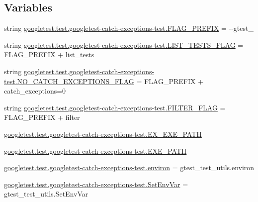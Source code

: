 \subsection*{Variables}
\begin{DoxyCompactItemize}
\item 
string \mbox{\hyperlink{namespacegoogletest_1_1test_1_1googletest-catch-exceptions-test_a0eac6ce19a7544730f48e9ed635da182}{googletest.\+test.\+googletest-\/catch-\/exceptions-\/test.\+F\+L\+A\+G\+\_\+\+P\+R\+E\+F\+IX}} = \textquotesingle{}-\/-\/gtest\+\_\+\textquotesingle{}
\item 
string \mbox{\hyperlink{namespacegoogletest_1_1test_1_1googletest-catch-exceptions-test_a8847d0162a6c3e6a01a74331f3084da8}{googletest.\+test.\+googletest-\/catch-\/exceptions-\/test.\+L\+I\+S\+T\+\_\+\+T\+E\+S\+T\+S\+\_\+\+F\+L\+AG}} = F\+L\+A\+G\+\_\+\+P\+R\+E\+F\+IX + \textquotesingle{}list\+\_\+tests\textquotesingle{}
\item 
string \mbox{\hyperlink{namespacegoogletest_1_1test_1_1googletest-catch-exceptions-test_aaad2a7abcb760b818aa6802120acd651}{googletest.\+test.\+googletest-\/catch-\/exceptions-\/test.\+N\+O\+\_\+\+C\+A\+T\+C\+H\+\_\+\+E\+X\+C\+E\+P\+T\+I\+O\+N\+S\+\_\+\+F\+L\+AG}} = F\+L\+A\+G\+\_\+\+P\+R\+E\+F\+IX + \textquotesingle{}catch\+\_\+exceptions=0\textquotesingle{}
\item 
string \mbox{\hyperlink{namespacegoogletest_1_1test_1_1googletest-catch-exceptions-test_a1233a65dcef8ecb6f518d43e241aeb8d}{googletest.\+test.\+googletest-\/catch-\/exceptions-\/test.\+F\+I\+L\+T\+E\+R\+\_\+\+F\+L\+AG}} = F\+L\+A\+G\+\_\+\+P\+R\+E\+F\+IX + \textquotesingle{}filter\textquotesingle{}
\item 
\mbox{\hyperlink{namespacegoogletest_1_1test_1_1googletest-catch-exceptions-test_a99d8f5239cc54cda82f69509d3b22160}{googletest.\+test.\+googletest-\/catch-\/exceptions-\/test.\+E\+X\+\_\+\+E\+X\+E\+\_\+\+P\+A\+TH}}
\item 
\mbox{\hyperlink{namespacegoogletest_1_1test_1_1googletest-catch-exceptions-test_a410cb8694539d864ade93a277bb03fa5}{googletest.\+test.\+googletest-\/catch-\/exceptions-\/test.\+E\+X\+E\+\_\+\+P\+A\+TH}}
\item 
\mbox{\hyperlink{namespacegoogletest_1_1test_1_1googletest-catch-exceptions-test_a31db01bdbed9bc5476d4747cacb3b668}{googletest.\+test.\+googletest-\/catch-\/exceptions-\/test.\+environ}} = gtest\+\_\+test\+\_\+utils.\+environ
\item 
\mbox{\hyperlink{namespacegoogletest_1_1test_1_1googletest-catch-exceptions-test_a95c639009082a8cdf39720c3a2dd859c}{googletest.\+test.\+googletest-\/catch-\/exceptions-\/test.\+Set\+Env\+Var}} = gtest\+\_\+test\+\_\+utils.\+Set\+Env\+Var

\end{DoxyCompactItemize}
